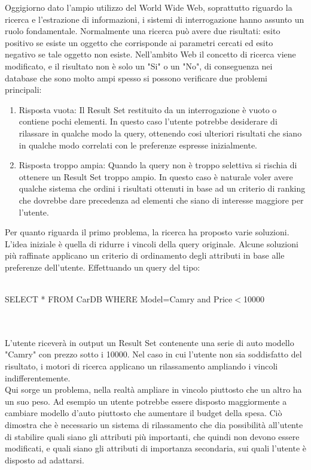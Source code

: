 Oggigiorno dato l'ampio utilizzo del World Wide Web, soprattutto riguardo la ricerca e l'estrazione di informazioni, i sistemi di interrogazione hanno assunto un ruolo fondamentale.
Normalmente una ricerca può avere due risultati: esito positivo se esiste un oggetto che corrisponde ai parametri cercati ed esito negativo se tale oggetto non esiste. Nell'ambito Web il concetto di ricerca viene modificato, e il risultato non è solo un "Si" o un "No", di conseguenza nei database che  sono molto ampi spesso si possono verificare due problemi principali:
\begin{enumerate}
    \item Risposta vuota: Il Result Set restituito da un interrogazione è vuoto o contiene pochi elementi. In questo caso l'utente potrebbe desiderare di rilassare in qualche modo la query, ottenendo cosi ulteriori risultati che siano in qualche modo correlati con le preferenze espresse inizialmente.
    \item Risposta troppo ampia: Quando la query non è troppo selettiva si rischia di ottenere un Result Set troppo ampio. In questo caso è naturale voler avere qualche sistema che ordini i risultati ottenuti in base ad un criterio di ranking che dovrebbe dare precedenza ad elementi che siano di  interesse maggiore per l'utente.
\end{enumerate}

Per quanto riguarda il primo problema, la ricerca ha proposto varie soluzioni. L'idea iniziale è quella di ridurre i vincoli della query originale. Alcune soluzioni più raffinate applicano un criterio di ordinamento degli attributi in base alle preferenze dell'utente. Effettuando un query del tipo:
\\~\\
\centerline{SELECT * FROM CarDB WHERE Model=Camry and Price$<$10000}
\\~\\
L'utente riceverà in output un Result Set contenente una serie di auto modello "Camry" con prezzo sotto i 10000. Nel caso in cui l'utente non sia soddisfatto del risultato, i motori di ricerca applicano un rilassamento ampliando i vincoli indifferentemente. \\
Qui sorge un problema, nella realtà ampliare in vincolo piuttosto che un altro ha un suo peso. Ad esempio un utente potrebbe essere disposto maggiormente a cambiare modello d'auto piuttosto che aumentare il budget della spesa. Ciò dimostra che è necessario un sistema di rilassamento che dia possibilità all'utente di stabilire quali siano gli attributi più importanti, che quindi non devono essere modificati, e quali siano gli attributi di importanza secondaria, sui quali l'utente è disposto ad adattarsi. 
